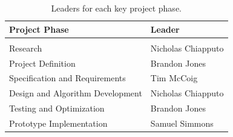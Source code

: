 \documentclass[11pt]{IEEEtran}
\begin{document}
			\begin{table}[tb]
				\centering
				\caption{Leaders for each key project phase.}
				\label{tab:phaseLeaders}
				\begin{tabularx}{\linewidth}{l|l}
					Project Phase 						& Leader \\
					\hline
					\vspace{-0.1in}						& \\
					Research 							& Nicholas Chiapputo \\
					Project Definition					& Brandon Jones \\
					Specification and Requirements 		& Tim McCoig \\
					Design and Algorithm Development 	& Nicholas Chiapputo \\
					Testing and Optimization 			& Brandon Jones \\
					Prototype Implementation 			& Samuel Simmons
				\end{tabularx}
			\end{table}
\end{document}

